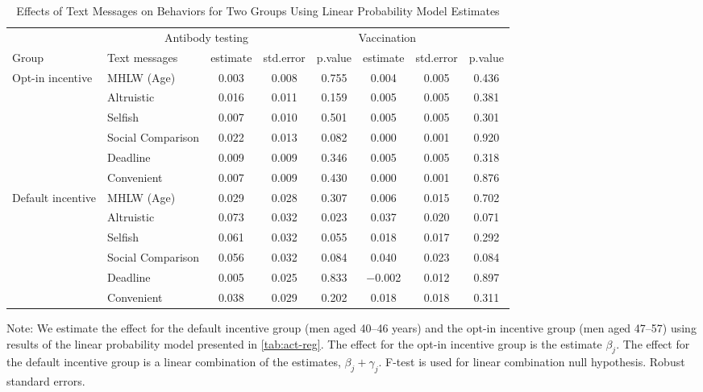 \begin{table}

\caption{Effects of Text Messages on Behaviors for Two Groups Using Linear Probability Model Estimates \label{tab:act-reg-ftest}}
\centering
\fontsize{9}{11}\selectfont
\begin{threeparttable}
\begin{tabular}[t]{>{\raggedright\arraybackslash}p{5em}lcccccc}
\toprule
\multicolumn{2}{c}{ } & \multicolumn{3}{c}{Antibody testing} & \multicolumn{3}{c}{Vaccination} \\
\cmidrule(l{3pt}r{3pt}){3-5} \cmidrule(l{3pt}r{3pt}){6-8}
Group & Text messages & estimate & std.error & p.value & estimate  & std.error  & p.value \\
\midrule
Opt-in incentive & MHLW (Age) & \num{0.003} & \num{0.008} & \num{0.755} & \num{0.004} & \num{0.005} & \num{0.436}\\
 & Altruistic & \num{0.016} & \num{0.011} & \num{0.159} & \num{0.005} & \num{0.005} & \num{0.381}\\
 & Selfish & \num{0.007} & \num{0.010} & \num{0.501} & \num{0.005} & \num{0.005} & \num{0.301}\\
 & Social Comparison & \num{0.022} & \num{0.013} & \num{0.082} & \num{0.000} & \num{0.001} & \num{0.920}\\
 & Deadline & \num{0.009} & \num{0.009} & \num{0.346} & \num{0.005} & \num{0.005} & \num{0.318}\\
 & Convenient & \num{0.007} & \num{0.009} & \num{0.430} & \num{0.000} & \num{0.001} & \num{0.876}\\
Default incentive & MHLW (Age) & \num{0.029} & \num{0.028} & \num{0.307} & \num{0.006} & \num{0.015} & \num{0.702}\\
 & Altruistic & \num{0.073} & \num{0.032} & \num{0.023} & \num{0.037} & \num{0.020} & \num{0.071}\\
 & Selfish & \num{0.061} & \num{0.032} & \num{0.055} & \num{0.018} & \num{0.017} & \num{0.292}\\
 & Social Comparison & \num{0.056} & \num{0.032} & \num{0.084} & \num{0.040} & \num{0.023} & \num{0.084}\\
 & Deadline & \num{0.005} & \num{0.025} & \num{0.833} & \num{-0.002} & \num{0.012} & \num{0.897}\\
 & Convenient & \num{0.038} & \num{0.029} & \num{0.202} & \num{0.018} & \num{0.018} & \num{0.311}\\
\bottomrule
\end{tabular}
\begin{tablenotes}
\item Note: We estimate the effect for the default incentive group (men aged 40--46 years) and the opt-in incentive group (men aged 47--57) using results of the linear probability model presented in \ref{tab:act-reg}. The effect for the opt-in incentive group is the estimate $\beta_j$. The effect for the default incentive group is a linear combination of the estimates, $\beta_j + \gamma_j$. F-test is used for linear combination null hypothesis. Robust standard errors.
\end{tablenotes}
\end{threeparttable}
\end{table}
